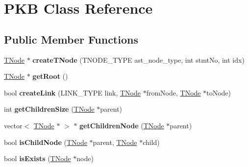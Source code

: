 \hypertarget{class_p_k_b}{}\section{P\+K\+B Class Reference}
\label{class_p_k_b}
\subsection*{Public Member Functions}
\begin{DoxyCompactItemize}
\item 
\hypertarget{class_p_k_b_a5612d22361c1037a9dca418bd9e345ec}{}\hyperlink{class_t_node}{T\+Node} $\ast$ {\bfseries create\+T\+Node} (T\+N\+O\+D\+E\+\_\+\+T\+Y\+P\+E ast\+\_\+node\+\_\+type, int stmt\+No, int idx)\label{class_p_k_b_a5612d22361c1037a9dca418bd9e345ec}

\item 
\hypertarget{class_p_k_b_a9e2e37a6df4cb87146b0fd9e5fd6cd67}{}\hyperlink{class_t_node}{T\+Node} $\ast$ {\bfseries get\+Root} ()\label{class_p_k_b_a9e2e37a6df4cb87146b0fd9e5fd6cd67}

\item 
\hypertarget{class_p_k_b_a0c1c1c5a588f2a14f89d7bc3a6925650}{}bool {\bfseries create\+Link} (L\+I\+N\+K\+\_\+\+T\+Y\+P\+E link, \hyperlink{class_t_node}{T\+Node} $\ast$from\+Node, \hyperlink{class_t_node}{T\+Node} $\ast$to\+Node)\label{class_p_k_b_a0c1c1c5a588f2a14f89d7bc3a6925650}

\item 
\hypertarget{class_p_k_b_a721bfb2515f76b6987ddd1c98f6f75f3}{}int {\bfseries get\+Children\+Size} (\hyperlink{class_t_node}{T\+Node} $\ast$parent)\label{class_p_k_b_a721bfb2515f76b6987ddd1c98f6f75f3}

\item 
\hypertarget{class_p_k_b_a7c1cb3bc60d600e86d3da40a488b39db}{}vector$<$ \hyperlink{class_t_node}{T\+Node} $\ast$ $>$ $\ast$ {\bfseries get\+Children\+Node} (\hyperlink{class_t_node}{T\+Node} $\ast$parent)\label{class_p_k_b_a7c1cb3bc60d600e86d3da40a488b39db}

\item 
\hypertarget{class_p_k_b_ab3b48cdd915cc46e215b56465e85bced}{}bool {\bfseries is\+Child\+Node} (\hyperlink{class_t_node}{T\+Node} $\ast$parent, \hyperlink{class_t_node}{T\+Node} $\ast$child)\label{class_p_k_b_ab3b48cdd915cc46e215b56465e85bced}

\item 
\hypertarget{class_p_k_b_a09ebe6d9c9bc88d6547a73ea8196c1bf}{}bool {\bfseries is\+Exists} (\hyperlink{class_t_node}{T\+Node} $\ast$node)\label{class_p_k_b_a09ebe6d9c9bc88d6547a73ea8196c1bf}


\end{DoxyCompactItemize}
